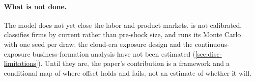 \paragraph{What is not done.}
The model does not yet close the labor and product markets, is not calibrated, classifies firms by current rather than pre-shock size, and runs its Monte Carlo with one seed per draw; the cloud-era exposure design and the continuous-exposure business-formation analysis have not been estimated (\cref{sec:disc-limitations}).
Until they are, the paper's contribution is a framework and a conditional map of where offset holds and fails, not an estimate of whether it will.
